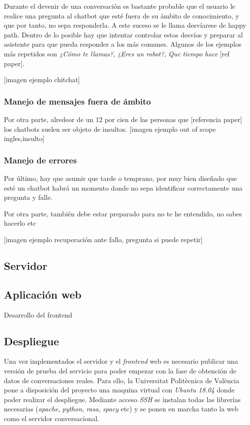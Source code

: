 Durante el devenir de una conversación es bastante probable que el usuario le realice una pregunta al chatbot que esté fuera de su ámbito de conocimiento, y que por tanto, no sepa responderla. A este suceso se le llama desvíarese de happy path. Dentro de lo posible hay que intentar controlar estos desvíos y preparar al asistente para que pueda responder a los más comunes. Algunos de los ejemplos más repetidos son \textit{¿Cómo te llamas?}, \textit{¿Eres un robot?}, \textit{Que tiempo hace} [ref paper].

[imagen ejemplo  chitchat]


\subsubsection{Manejo de mensajes fuera de ámbito}
Por otra parte, alredeor de un 12 por cien de las personas que  [referencia paper] los chatbots suelen ser objeto de insultos.
[imagen ejemplo out of scope ingles,insulto]

\cite{bestPracticesNLU}

\subsubsection{Manejo de errores}
Por último, hay que asumir que tarde o temprano, por muy bien diseñado que esté un chatbot habrá un momento donde no sepa identificar correctamente una pregunta y falle.

Por otra parte, también debe estar preparado para no te he entendido, no sabes hacerlo etc

[imagen ejemplo recuperación ante fallo, pregunta si puede repetir]

\subsection{Servidor}

\subsection{Aplicación web}
Desarrollo del frontend

\subsection{Despliegue}
Una vez implementados el servidor y el \textit{frontend} web es necesario publicar una versión de prueba del servicio para poder empezar con la fase de obtención de datos de conversaciones reales. Para ello, la Universitat Politècnica de València pone a disposición del proyecto una maquina virtual con \textit{Ubuntu 18.04} donde poder realizar el despliegue. Mediante acceso \textit{SSH} se instalan todas las librerías necesarias (\textit{apache}, \textit{python}, \textit{rasa}, \textit{spacy} etc) y se ponen en marcha tanto la web como el servidor conversacional.\\

